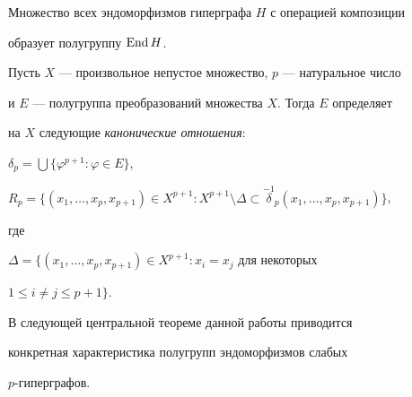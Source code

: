 Множество всех эндоморфизмов гиперграфа $H$ с операцией композиции 


образует полугруппу $\operatorname{End} H$. 


 


Пусть $X$ --- произвольное непустое множество, $p$ --- натуральное число 


и $E$ --- полугруппа преобразований множества $X$. Тогда $E$ определяет 


на $X$ следующие {\it канонические отношения}: 


$\delta_p=\bigcup\{\varphi^{p+1}:\varphi\in E\}$, 


$R_p=\{(x_1,\dotsc,x_p,x_{p+1})\in X^{p+1}:X^{p+1}\setminus 


\Delta\subset\overset{-1}{\delta}{}_p(x_1,\dotsc,x_p,x_{p+1})\}$, 


где 


$\Delta=\{(x_1,\dotsc,x_p,x_{p+1})\in X^{p+1}:x_i=x_j$ для некоторых 


$1\le i\ne j\le p+1\}$.


 


В следующей центральной теореме данной работы приводится 


конкретная характеристика полугрупп эндоморфизмов слабых 


$p$-гиперграфов. 


 


